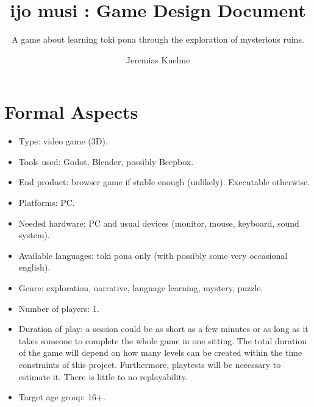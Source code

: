 \documentclass{scrartcl}
\title{ijo musi : Game Design Document}
\subtitle{A game about learning toki pona through the exploration of mysterious ruins.}
\author{Jeremias Kuehne}
\begin{document}
	
	\maketitle
	\section{Formal Aspects}
		\begin{itemize}
			\item Type: video game (3D).
			\item Tools used: Godot, Blender, possibly Beepbox.
			\item End product: browser game if stable enough (unlikely). Executable otherwise.
			\item Platforms: PC.
			\item Needed hardware: PC and usual devices (monitor, mouse, keyboard, sound system).
			\item Available languages: toki pona only (with possibly some very occasional english).
			\item Genre: exploration, narrative, language learning, mystery, puzzle.
			\item Number of players: 1.
			\item Duration of play: a session could be as short as a few minutes or as long as it takes someone to complete the whole game in one sitting. The total duration of the game will depend on how many levels can be created within the time constraints of this project. Furthermore, playtests will be necessary to estimate it. There is little to no replayability.
			\item Target age group: 16+.
		\end{itemize}
\end{document}
